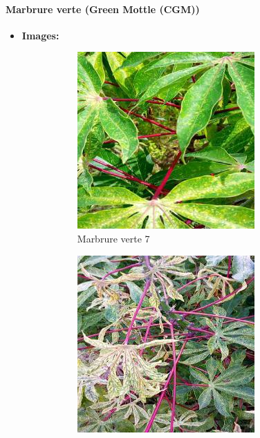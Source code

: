 \documentclass{article}
\begin{document}
		
		
		\paragraph{Marbrure verte (Green Mottle (CGM))}
		\begin{itemize}
			\item \textbf{Images: }
			\begin{figure}[htbp]
				\centering
				\begin{subfigure}[b]{0.3\textwidth}
					\centering
					\includegraphics[width=\textwidth]{img/7.jpg}
					\caption{Marbrure verte 7}
				\end{subfigure}
				\hfill
				\begin{subfigure}[b]{0.3\textwidth}
					\centering
					\includegraphics[width=\textwidth]{img/8.jpg}

\end{subfigure}
\end{figure}
\end{itemize}
\end{document}
